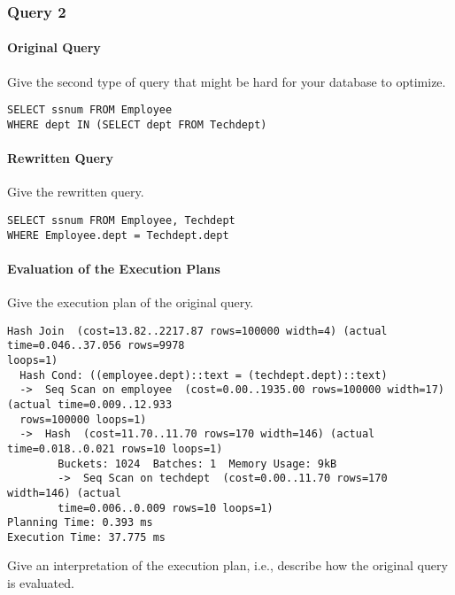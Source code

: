 \documentclass[11pt]{scrartcl}
\begin{document}
    \subsubsection*{Query 2}

    \paragraph{Original Query}

    Give the second type of query that might be hard for your database to optimize.

    \begin{lstlisting}[style=dbtsql]
SELECT ssnum FROM Employee
WHERE dept IN (SELECT dept FROM Techdept)
    \end{lstlisting}

    \paragraph{Rewritten Query}

    Give the rewritten query.

    \begin{lstlisting}[style=dbtsql]
SELECT ssnum FROM Employee, Techdept
WHERE Employee.dept = Techdept.dept
    \end{lstlisting}

    \paragraph{Evaluation of the Execution Plans}

    Give the execution plan of the original query.

            {\small
    \parskip0pt
    \begin{verbatim}
Hash Join  (cost=13.82..2217.87 rows=100000 width=4) (actual time=0.046..37.056 rows=9978 
loops=1)
  Hash Cond: ((employee.dept)::text = (techdept.dept)::text)
  ->  Seq Scan on employee  (cost=0.00..1935.00 rows=100000 width=17) (actual time=0.009..12.933 
  rows=100000 loops=1)
  ->  Hash  (cost=11.70..11.70 rows=170 width=146) (actual time=0.018..0.021 rows=10 loops=1)
        Buckets: 1024  Batches: 1  Memory Usage: 9kB
        ->  Seq Scan on techdept  (cost=0.00..11.70 rows=170 width=146) (actual 
        time=0.006..0.009 rows=10 loops=1)
Planning Time: 0.393 ms
Execution Time: 37.775 ms
    \end{verbatim}}

    Give an interpretation of the execution plan, i.e., describe how the original query is evaluated.
\end{document}
